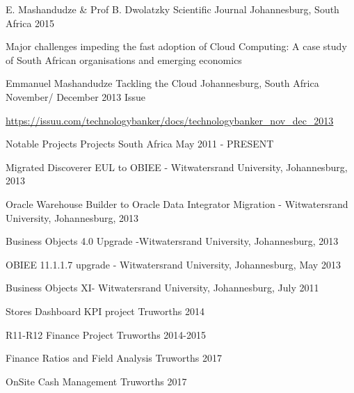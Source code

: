 


\begin{cventries}


\cventry
{E. Mashandudze \& Prof B. Dwolatzky} %
{Scientific Journal} %
{Johannesburg, South Africa} %
{2015} %
{ %
\begin{cvitems}
\item {Major challenges impeding the fast adoption of Cloud Computing: A case study of South African organisations and emerging economics}
\end{cvitems}
}


\cventry
{Emmanuel Mashandudze}
{Tackling the Cloud} %
{Johannesburg, South Africa} %
{November/ December 2013 Issue} %
{ %
\begin{cvitems}
\item \url{https://issuu.com/technologybanker/docs/technologybanker_nov_dec_2013}
\end{cvitems}
}



\cventry
{Notable Projects} %
{Projects} %
{South Africa} %
{May 2011 - PRESENT} %
{ %
\begin{cvitems}
\item{Migrated Discoverer EUL to OBIEE -  Witwatersrand University, Johannesburg, 2013}
\item{Oracle Warehouse Builder to Oracle Data Integrator Migration -  Witwatersrand University, Johannesburg, 2013}
\item{Business Objects 4.0 Upgrade -Witwatersrand University, Johannesburg, 2013}
\item{OBIEE 11.1.1.7 upgrade - Witwatersrand University, Johannesburg, May 2013}
\item{Business Objects XI- Witwatersrand University, Johannesburg, July 2011}
\item{Stores Dashboard KPI project Truworths 2014}
\item{R11-R12 Finance Project Truworths 2014-2015}
\item{Finance Ratios and Field Analysis Truworths 2017}
\item{OnSite Cash Management Truworths 2017}
\end{cvitems}
}


\end{cventries}
